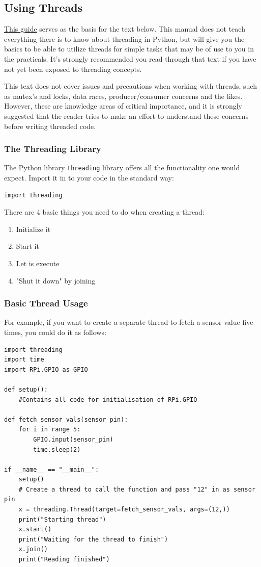 \subsection{Using Threads}
\href{https://realpython.com/intro-to-python-threading/}{This guide} serves as the basis for the text below. This manual does not teach everything there is to know about threading in Python, but will give you the basics to be able to utilize threads for simple tasks that may be of use to you in the practicals. It's strongly recommended you read through that text if you have not yet been exposed to threading concepts.

This text does not cover issues and precautions when working with threads, such as mutex's and locks, data races, producer/consumer concerns and the likes. However, these are knowledge areas of critical importance, and it is strongly suggested that the reader tries to make an effort to understand these concerns before writing threaded code.

\subsubsection{The Threading Library}
The Python library \verb|threading| library offers all the functionality one would expect. Import it in to your code in the standard way:
\begin{lstlisting}
import threading
\end{lstlisting}

There are 4 basic things you need to do when creating a thread:
\begin{enumerate}
    \item Initialize it
    \item Start it
    \item Let is execute
    \item "Shut it down" by joining
\end{enumerate}

\subsubsection{Basic Thread Usage}
For example, if you want to create a separate thread to fetch a sensor value five times, you could do it as follows:
\begin{lstlisting}
import threading
import time
import RPi.GPIO as GPIO

def setup():
    #Contains all code for initialisation of RPi.GPIO

def fetch_sensor_vals(sensor_pin):
    for i in range 5:
        GPIO.input(sensor_pin)
        time.sleep(2)
    
if __name__ == "__main__":
    setup()
    # Create a thread to call the function and pass "12" in as sensor pin
    x = threading.Thread(target=fetch_sensor_vals, args=(12,)) 
    print("Starting thread")
    x.start()
    print("Waiting for the thread to finish")
    x.join()
    print("Reading finished")
\end{lstlisting}

